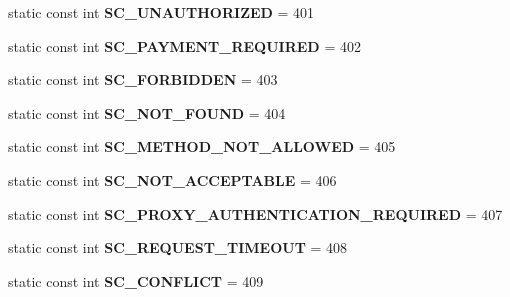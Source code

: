 \begin{DoxyCompactItemize}
\item 
\mbox{\label{class_http_servlet_response_a078b503f786bdc710241b45ea940cb15}} 
static const int {\bfseries S\+C\+\_\+\+U\+N\+A\+U\+T\+H\+O\+R\+I\+Z\+ED} = 401
\item 
\mbox{\label{class_http_servlet_response_a48bba48d3819553a9d6b417600bf5716}} 
static const int {\bfseries S\+C\+\_\+\+P\+A\+Y\+M\+E\+N\+T\+\_\+\+R\+E\+Q\+U\+I\+R\+ED} = 402
\item 
\mbox{\label{class_http_servlet_response_a21aa92f30b818c275d3c02be2723df0e}} 
static const int {\bfseries S\+C\+\_\+\+F\+O\+R\+B\+I\+D\+D\+EN} = 403
\item 
\mbox{\label{class_http_servlet_response_a6679d67932547329af549e45a4b86a52}} 
static const int {\bfseries S\+C\+\_\+\+N\+O\+T\+\_\+\+F\+O\+U\+ND} = 404
\item 
\mbox{\label{class_http_servlet_response_afb9aad2def9e3f3741011ec874f81f8d}} 
static const int {\bfseries S\+C\+\_\+\+M\+E\+T\+H\+O\+D\+\_\+\+N\+O\+T\+\_\+\+A\+L\+L\+O\+W\+ED} = 405
\item 
\mbox{\label{class_http_servlet_response_a9016d30f4bba75878996ec9b0351cfdc}} 
static const int {\bfseries S\+C\+\_\+\+N\+O\+T\+\_\+\+A\+C\+C\+E\+P\+T\+A\+B\+LE} = 406
\item 
\mbox{\label{class_http_servlet_response_a94f54353eed1b19a42becd7bc7b91c17}} 
static const int {\bfseries S\+C\+\_\+\+P\+R\+O\+X\+Y\+\_\+\+A\+U\+T\+H\+E\+N\+T\+I\+C\+A\+T\+I\+O\+N\+\_\+\+R\+E\+Q\+U\+I\+R\+ED} = 407
\item 
\mbox{\label{class_http_servlet_response_af3d39e84355ff115e7218a217424ac30}} 
static const int {\bfseries S\+C\+\_\+\+R\+E\+Q\+U\+E\+S\+T\+\_\+\+T\+I\+M\+E\+O\+UT} = 408
\item 
\mbox{\label{class_http_servlet_response_a7ab66eb85cdf1f82dbaa05c4fa174f51}} 
static const int {\bfseries S\+C\+\_\+\+C\+O\+N\+F\+L\+I\+CT} = 409

\end{DoxyCompactItemize}
